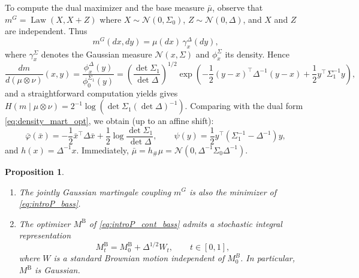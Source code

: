 \documentclass[reqno, a4paper]{amsart}
\theoremstyle{plain}
\newtheorem{proposition}[theorem]{Proposition}
\theoremstyle{definition}
\theoremstyle{remark}
\numberwithin{equation}{section}
\numberwithin{theorem}{section}
\newcommand{\Law}{\operatorname{Law}}
\begin{document}
    To compute the dual maximizer and the base measure $\bar \mu$, observe that $m^G = \Law(X,X+Z)$ where $X\sim\mathcal N(0,\Sigma_0)$, $
	Z\sim\mathcal N(0,\Delta)$, and $X$ and $Z$ are independent. Thus
	\begin{equation}\label{eq:disintegration_gaussian}
	    m^G(dx,dy)=\mu(dx)\,\gamma_x^\Delta(dy),
	\end{equation}
	where $\gamma_x^\Sigma$ denotes the Gaussian measure $\mathcal N(x,\Sigma)$ and $\phi_x^\Sigma$ its density. Hence
	\[
	\frac{dm}{d(\mu\otimes\nu)}(x,y)
	=\frac{\phi_x^\Delta(y)}{\phi_0^{\Sigma_1}(y)} = \left(\frac{\det\Sigma_1}{\det\Delta}\right)^{1/2}
	\exp\!\left(
	-\frac12 (y-x)^\top\Delta^{-1}(y-x)
	+\frac12 y^\top\Sigma_1^{-1}y
	\right),
	\]
	and a straightforward computation yields %
	gives
	$
	H(m\mid\mu\otimes\nu)
	=2^{-1}\log ( \det\Sigma_1 (\det\Delta)^{-1}).
	$
	Comparing with the dual form \eqref{eq:density_mart_opt}, we obtain (up to an affine shift):
    $$\bar\varphi(\bar x)=-\frac12 \bar x^\top\Delta \bar x
		+\frac12\log\frac{\det\Sigma_1}{\det\Delta}, \qquad \psi(y)=\frac12 y^\top(\Sigma_1^{-1}-\Delta^{-1})y,$$
    and $h(x)=\Delta^{-1}x$. Immediately, $\bar \mu = h_\# \mu = \mathcal N(0,\Delta^{-1} \Sigma_0 \Delta^{-1}).$ 	
	\begin{proposition}\label{pro:comupation_gaussian_Bass}\hfill
		\begin{enumerate}
			\item The jointly Gaussian martingale coupling $m^G$ is also the minimizer of \eqref{eq:introP_bass}.
			\item The optimizer $M^{\mathrm B}$ of \eqref{eq:introP_cont_bass} admits a stochastic integral representation
			\begin{equation} \label{eq:M^B_t}
				M_t^{\mathrm B}=M_0^{\mathrm B}+\Delta^{1/2}W_t,
				\qquad t\in[0,1],
			\end{equation}
			where $W$ is a standard Brownian motion independent of $M_0^B$. In particular, $M^{\mathrm{B}}$ is Gaussian.
		\end{enumerate}
	\end{proposition}
	
\end{document}
